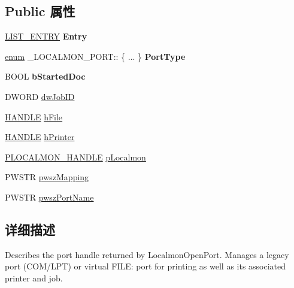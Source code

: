\subsection*{Public 属性}
\begin{DoxyCompactItemize}
\item 
\mbox{\label{struct___l_o_c_a_l_m_o_n___p_o_r_t_a854226536846ea5551fc7168d14edf60}} 
\hyperlink{struct___l_i_s_t___e_n_t_r_y}{L\+I\+S\+T\+\_\+\+E\+N\+T\+RY} {\bfseries Entry}
\item 
\mbox{\label{struct___l_o_c_a_l_m_o_n___p_o_r_t_a16295326c2c9eea9fabdaa5d49c8b8d5}} 
\hyperlink{interfaceenum}{enum} \+\_\+\+L\+O\+C\+A\+L\+M\+O\+N\+\_\+\+P\+O\+R\+T\+:: \{ ... \}  {\bfseries Port\+Type}
\item 
\mbox{\label{struct___l_o_c_a_l_m_o_n___p_o_r_t_aabb479a507560f3697cbc921b8f5b02d}} 
B\+O\+OL {\bfseries b\+Started\+Doc}
\item 
D\+W\+O\+RD \hyperlink{struct___l_o_c_a_l_m_o_n___p_o_r_t_aa4f9004e1c625becaa830598e44dc0af}{dw\+Job\+ID}
\item 
\hyperlink{interfacevoid}{H\+A\+N\+D\+LE} \hyperlink{struct___l_o_c_a_l_m_o_n___p_o_r_t_af7dcf99518dca93d0d33222dd123ab9e}{h\+File}
\item 
\hyperlink{interfacevoid}{H\+A\+N\+D\+LE} \hyperlink{struct___l_o_c_a_l_m_o_n___p_o_r_t_ae65326a2e52b64f72743941d83033c66}{h\+Printer}
\item 
\hyperlink{struct___l_o_c_a_l_m_o_n___h_a_n_d_l_e}{P\+L\+O\+C\+A\+L\+M\+O\+N\+\_\+\+H\+A\+N\+D\+LE} \hyperlink{struct___l_o_c_a_l_m_o_n___p_o_r_t_a65a47d188e0dc76fa39a891f04e7d45a}{p\+Localmon}
\item 
P\+W\+S\+TR \hyperlink{struct___l_o_c_a_l_m_o_n___p_o_r_t_a6cdc154efd2048a59da307eb25276eca}{pwsz\+Mapping}
\item 
P\+W\+S\+TR \hyperlink{struct___l_o_c_a_l_m_o_n___p_o_r_t_a1ceac66d08e0ee457051c8bf794f312f}{pwsz\+Port\+Name}
\end{DoxyCompactItemize}


\subsection{详细描述}
Describes the port handle returned by Localmon\+Open\+Port. Manages a legacy port (C\+O\+M/\+L\+PT) or virtual F\+I\+LE\+: port for printing as well as its associated printer and job. 

